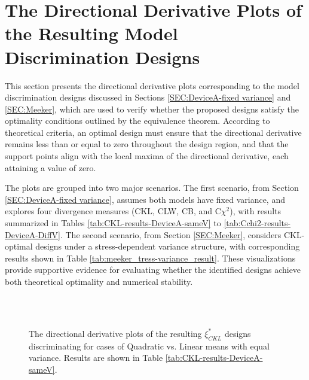 \chapter{The Directional Derivative Plots of the Resulting Model Discrimination Designs}\label{appendixA}

\hspace*{8mm} This section presents the directional derivative plots corresponding to the model discrimination designs discussed in Sections \ref{SEC:DeviceA-fixed variance} and \ref{SEC:Meeker}, which are used to verify whether the proposed designs satisfy the optimality conditions outlined by the equivalence theorem. According to theoretical criteria, an optimal design must ensure that the directional derivative remains less than or equal to zero throughout the design region, and that the support points align with the local maxima of the directional derivative, each attaining a value of zero.

\hspace*{8mm} The plots are grouped into two major scenarios. The first scenario, from Section \ref{SEC:DeviceA-fixed variance}, assumes both models have fixed variance, and explores four divergence measures (CKL, CLW, CB, and C$\chi^2$), with results summarized in Tables \ref{tab:CKL-results-DeviceA-sameV} to \ref{tab:Cchi2-results-DeviceA-DiffV}. The second scenario, from Section \ref{SEC:Meeker}, considers CKL-optimal designs under a stress-dependent variance structure, with corresponding results shown in Table \ref{tab:meeker_tress-variance_result}. These visualizations provide supportive evidence for evaluating whether the identified designs achieve both theoretical optimality and numerical stability.


\begin{figure}[H]
\centering
{}
\\
\\
\caption{The directional derivative plots of the resulting $\xi^*_{CKL}$ designs discriminating for cases of Quadratic vs. Linear means with equal variance. Results are shown in Table \ref{tab:CKL-results-DeviceA-sameV}.}
\label{fig:CKL-fixed-both-same-variance}
\end{figure}


